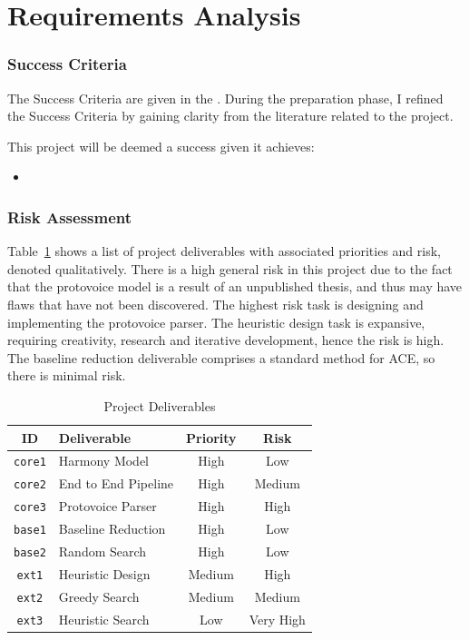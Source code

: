 \documentclass[12pt,a4paper,twoside,openright]{report}
\theoremstyle{definition}
\begin{document}
\section{Requirements Analysis}
\subsubsection{Success Criteria}
The Success Criteria are given in the . During the preparation phase, I refined the Success Criteria by gaining clarity from the literature related to the project. 

This project will be deemed a success given it achieves:
\begin{itemize}
  \item 
\end{itemize}

\subsubsection{Risk Assessment}

Table~\ref{tab:deliverables} shows a list of project deliverables with associated priorities and risk, denoted qualitatively. There is a high general risk in this project due to the fact that the protovoice model is a result of an unpublished thesis, and thus may have flaws that have not been discovered. The highest risk task is designing and implementing the protovoice parser. The heuristic design task is expansive, requiring creativity, research and iterative development, hence the risk is high. The baseline reduction deliverable comprises a standard method for ACE, so there is minimal risk.

\begin{table}[h]
  \caption{Project Deliverables}
  \vspace{\baselineskip}
  \label{tab:deliverables}
  \centering
  \begin{tabularx}{0.9\textwidth}{cXcc}
    {\large \textbf{ID}} & \large \textbf{Deliverable} & \large \textbf{Priority} & \large \textbf{Risk} \\
    \toprule
    \texttt{core1} & Harmony Model & High & Low \\
    \texttt{core2} & End to End Pipeline  & High & Medium \\
    \texttt{core3} & Protovoice Parser & High & High \\
    \texttt{base1} & Baseline Reduction & High & Low \\
    \texttt{base2} & Random Search & High & Low \\
    \texttt{ext1} & Heuristic Design & Medium & High \\
    \texttt{ext2} & Greedy Search & Medium & Medium \\
    \texttt{ext3} & Heuristic Search & Low & Very High \\
  \end{tabularx}
\end{table}
\end{document}
